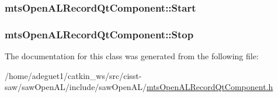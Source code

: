 \hypertarget{classmts_open_a_l_record_qt_component_a08e66f3406a5e1e671d804eb7f5151b2}{
\subsubsection[{Start}]{ mts\-Open\-A\-L\-Record\-Qt\-Component\-::\-Start}}\label{classmts_open_a_l_record_qt_component_a08e66f3406a5e1e671d804eb7f5151b2}
\hypertarget{classmts_open_a_l_record_qt_component_a1f3cb667990465971031f0ee0c2f96e6}{
\subsubsection[{Stop}]{ mts\-Open\-A\-L\-Record\-Qt\-Component\-::\-Stop}}\label{classmts_open_a_l_record_qt_component_a1f3cb667990465971031f0ee0c2f96e6}


The documentation for this class was generated from the following file\-:\begin{DoxyCompactItemize}
\item 
/home/adeguet1/catkin\-\_\-ws/src/cisst-\/saw/saw\-Open\-A\-L/include/saw\-Open\-A\-L/\hyperlink{mts_open_a_l_record_qt_component_8h}{mts\-Open\-A\-L\-Record\-Qt\-Component.\-h}\end{DoxyCompactItemize}
